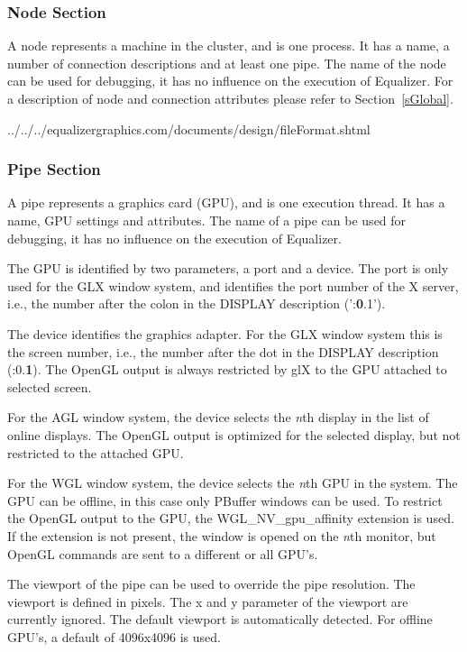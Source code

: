 \documentclass[10pt,a4]{scrartcl}
\newcommand{\sref}[1]{Section~\ref{#1}}
\begin{document}
\subsubsection{Node Section}

A node represents a machine in the cluster, and is one process. It has a
name, a number of connection descriptions and at least one pipe. The
name of the node can be used for debugging, it has no influence on the
execution of Equalizer. For a description of node and connection
attributes please refer to \sref{sGlobal}.

{\footnotesize
  {../../../equalizergraphics.com/documents/design/fileFormat.shtml}}

\subsubsection{Pipe Section}

A pipe represents a graphics card (GPU), and is one execution thread. It
has a name, GPU settings and attributes. The name of a pipe can be used
for debugging, it has no influence on the execution of Equalizer.

The GPU is identified by two parameters, a port and a device. The port
is only used for the GLX window system, and identifies the port number
of the X server, i.e., the number after the colon in the DISPLAY
description (':\textbf{0}.1').

The device identifies the graphics adapter. For the GLX window system
this is the screen number, i.e., the number after the dot in the DISPLAY
description (:0.\textbf{1}). The OpenGL output is always restricted by
glX to the GPU attached to selected screen.

For the AGL window system, the device selects the \textit{n}th display
in the list of online displays. The OpenGL output is optimized for the
selected display, but not restricted to the attached GPU.

For the WGL window system, the device selects the \textit{n}th GPU in
the system. The GPU can be offline, in this case only PBuffer windows
can be used. To restrict the OpenGL output to the GPU, the
\textsf{WGL\_NV\_gpu\_affinity} extension is used. If the extension is
not present, the window is opened on the \textit{n}th monitor, but
OpenGL commands are sent to a different or all GPU's.

The viewport of the pipe can be used to override the pipe
resolution. The viewport is defined in pixels. The x and y parameter of
the viewport are currently ignored. The default viewport is
automatically detected. For offline GPU's, a default of 4096x4096 is
used.
\end{document}
